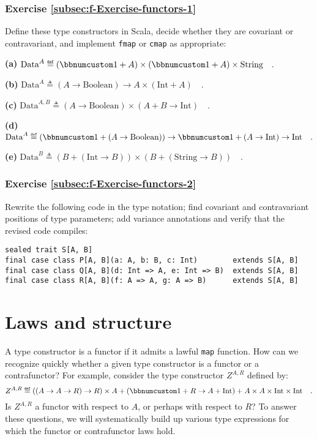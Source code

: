 \subsubsection{Exercise \label{subsec:f-Exercise-functors-1}\ref{subsec:f-Exercise-functors-1}}

Define these type constructors in Scala, decide whether they are covariant
or contravariant, and implement \lstinline!fmap! or \lstinline!cmap!
as appropriate:

\textbf{(a)} $\text{Data}^{A}\triangleq\left(\bbnum 1+A\right)\times\left(\bbnum 1+A\right)\times\text{String}\quad.$

\textbf{(b)} $\text{Data}^{A}\triangleq(A\rightarrow\text{Boolean})\rightarrow A\times\left(\text{Int}+A\right)\quad.$

\textbf{(c)} $\text{Data}^{A,B}\triangleq(A\rightarrow\text{Boolean})\times\left(A+B\rightarrow\text{Int}\right)\quad.$

\textbf{(d)} $\text{Data}^{A}\triangleq(\bbnum 1+(A\rightarrow\text{Boolean}))\rightarrow\bbnum 1+(A\rightarrow\text{Int})\rightarrow\text{Int}\quad.$

\textbf{(e)} $\text{Data}^{B}\triangleq(B+(\text{Int}\rightarrow B))\times(B+(\text{String}\rightarrow B))\quad.$

\subsubsection{Exercise \label{subsec:f-Exercise-functors-2}\ref{subsec:f-Exercise-functors-2}}

Rewrite the following code in the type notation; find covariant and
contravariant positions of type parameters; add variance annotations
and verify that the revised code compiles:

\begin{lstlisting}
sealed trait S[A, B]
final case class P[A, B](a: A, b: B, c: Int)        extends S[A, B]
final case class Q[A, B](d: Int => A, e: Int => B)  extends S[A, B]
final case class R[A, B](f: A => A, g: A => B)      extends S[A, B]
\end{lstlisting}


\section{Laws and structure\label{sec:f-Laws-and-structure}}

A type constructor is a functor if it admits a lawful \lstinline!map!
function. How can we recognize quickly whether a given type constructor
is a functor or a contrafunctor? For example, consider the type constructor
$Z^{A,R}$ defined by: 
\begin{equation}
Z^{A,R}\triangleq\left(\left(A\rightarrow A\rightarrow R\right)\rightarrow R\right)\times A+\left(\bbnum 1+R\rightarrow A+\text{Int}\right)+A\times A\times\text{Int}\times\text{Int}\quad.\label{eq:f-example-complicated-z}
\end{equation}
Is $Z^{A,R}$ a functor with respect to $A$, or perhaps with respect
to $R$? To answer these questions, we will systematically build up
various type expressions for which the functor or contrafunctor laws
hold. 

